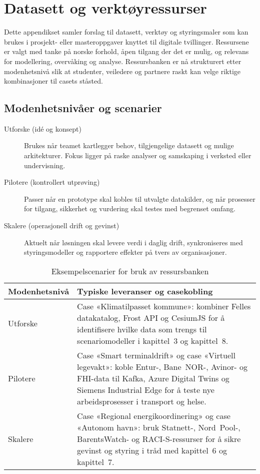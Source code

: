 \chapter{Datasett og verktøyressurser}
\label{appendix:ressurser}

Dette appendikset samler forslag til datasett, verktøy og styringsmaler som kan brukes i prosjekt- eller masteroppgaver knyttet til digitale tvillinger. Ressursene er valgt med tanke på norske forhold, åpen tilgang der det er mulig, og relevans for modellering, overvåking og analyse. Ressursbanken er nå strukturert etter modenhetsnivå slik at studenter, veiledere og partnere raskt kan velge riktige kombinasjoner til casets ståsted.

\section{Modenhetsnivåer og scenarier}
\begin{description}
    \item[Utforske (idé og konsept)] Brukes når teamet kartlegger behov, tilgjengelige datasett og mulige arkitekturer. Fokus ligger på raske analyser og samskaping i verksted eller undervisning.
    \item[Pilotere (kontrollert utprøving)] Passer når en prototype skal kobles til utvalgte datakilder, og når prosesser for tilgang, sikkerhet og vurdering skal testes med begrenset omfang.
    \item[Skalere (operasjonell drift og gevinst)] Aktuelt når løsningen skal levere verdi i daglig drift, synkroniseres med styringsmodeller og rapportere effekter på tvers av organisasjoner.
\end{description}

\begin{table}[h]
    \centering
    \caption{Eksempelscenarier for bruk av ressursbanken}
    \label{tab:ressurs-scenarier}
    \begin{tabular}{p{}p{}}
        \toprule
        \textbf{Modenhetsnivå} & \textbf{Typiske leveranser og casekobling} \\
        \midrule
        Utforske & Case «Klimatilpasset kommune»: kombiner Felles datakatalog, Frost API og CesiumJS for å identifisere hvilke data som trengs til scenariomodeller i kapittel~3 og kapittel~8. \\
        Pilotere & Case «Smart terminaldrift» og case «Virtuell legevakt»: koble Entur-, Bane~NOR-, Avinor- og FHI-data til Kafka, Azure Digital Twins og Siemens Industrial Edge for å teste nye arbeidsprosesser i transport og helse. \\
        Skalere & Case «Regional energikoordinering» og case «Autonom havn»: bruk Statnett-, Nord~Pool-, BarentsWatch- og RACI-S-ressurser for å sikre gevinst og styring i tråd med kapittel~6 og kapittel~7. \\
        \bottomrule
    \end{tabular}
\end{table}

